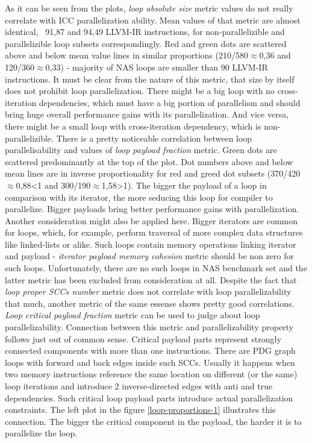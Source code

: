 \null\qquad As it can be seen from the plots, \textit{loop absolute size} metric values do not really correlate with ICC parallelization ability. Mean values of that metric are almost identical, ~91,87 and 94,49 LLVM-IR instructions, for non-parallelizible and parallelizible loop subsets correspondingly. Red and green dots are scattered above and below mean value lines in similar proportions (210/580$\approx$0,36 and 120/360$\approx$0,33) - majority of NAS loops are smaller than 90 LLVM-IR instructions.\newline
\null\qquad It must be clear from the nature of this metric, that size by itself does not prohibit loop parallelization. There might be a big loop with no cross-iteration dependencies, which must have a big portion of parallelism and should bring huge overall performance gains with its parallelization. And vice versa, there might be a small loop with cross-iteration dependency, which is non-parallelizible.\newline
\null\qquad There is a pretty noticeable correlation between loop parallelisability and values of \textit{loop payload fraction} metric. Green dots are scattered predominantly at the top of the plot. Dot numbers above and below mean lines are in inverse proportionality for red and greed dot subsets (370/420$\approx$0,88\textless 1 and 300/190$\approx$1,58\textgreater 1).  The bigger the payload of a loop in comparison with its iterator, the more seducing this loop for compiler to parallelize. Bigger payloads bring better performance gains with parallelization. Another consideration might also be applied here. Bigger iterators are common for loops, which, for example, perform traversal of more complex data structures like linked-lists or alike. Such loops contain memory operations linking iterator and payload - \textit{iterator payload memory cohesion} metric should be non zero for such loops. Unfortunately, there are no such loops in NAS benchmark set and the latter metric has been excluded from consideration at all.\newline 
\null\qquad Despite the fact that \textit{loop proper SCCs number} metric does not correlate with loop parallelizability that much, another metric of the same essense shows pretty good correlations. \textit{Loop critical payload fraction} metric can be used to judge about loop parallelizability. Connection between this metric and parallelizability property follows just out of common sense. Critical payload parts represent strongly connected components with more than one instructions. There are PDG graph loops with forward and back edges inside such SCCs. Usually it happens when two memory instructions reference the same location on different (or the same) loop iterations and introduce 2 inverse-directed edges with anti and true dependencies. Such critical loop payload parts introduce actual parallelization constraints. The left plot in the figure \ref{loop-proportions-1} illustrates this connection. The bigger the critical component in the payload, the harder it is to parallelize the loop.
